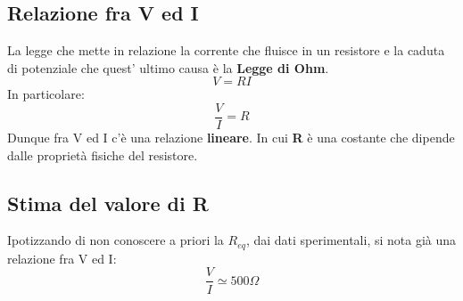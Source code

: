 \documentclass{article}
\begin{document}
		
		\subsection{Relazione fra V ed I}
			La legge che mette in relazione la corrente che fluisce in un resistore e la caduta di potenziale che quest' ultimo causa è la \textbf{Legge di Ohm}.
			\begin{equation}
				V = RI
			\end{equation}
			In particolare:
				\begin{equation}
				\frac{V}{I} = R
			\end{equation}
			Dunque fra V ed I c'è una relazione \textbf{lineare}. In cui \textbf{R} è una costante che dipende dalle proprietà fisiche del resistore.
		
		
		\subsection{Stima del valore di R}
		Ipotizzando di non conoscere a priori la $R_{eq}$, dai dati sperimentali, si nota già una relazione fra V ed I:
		\begin{equation}
			\frac{V}{I} \simeq 500\Omega
		\end{equation}
				
				
	
	
\end{document}

